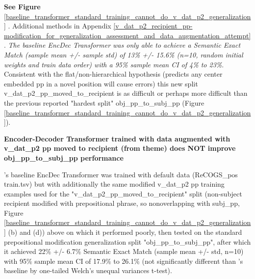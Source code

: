\documentclass[11pt]{article}
\begin{document}
\textbf{See Figure} \ref{baseline_transformer_standard_training_cannot_do_v_dat_p2_generalization} . Additional methods in Appendix \ref{v_dat_p2_recipient_pp-modification_for_generalization_assessment_and_data_augmentation_attempt}.
\textit{The baseline \citep{Wu2023} EncDec Transformer was only able to achieve a Semantic Exact Match (sample mean +/- sample std) of 13\% +/- 15.6\% (n=10, random initial weights and train data order) with a 95\% sample mean CI of 4\% to 23\%}. Consistent with the flat/non-hierarchical hypothesis (predicts any center embedded pp in a novel position will cause errors) this new split v\_dat\_p2\_pp\_moved\_to\_recipient is as difficult or perhaps more difficult than the previous reported "hardest split" obj\_pp\_to\_subj\_pp (Figure \ref{baseline_transformer_standard_training_cannot_do_v_dat_p2_generalization}).

\textbf{\citep{Wu2023} Encoder-Decoder Transformer trained with data augmented with v\_dat\_p2 pp moved to recipient (from theme) does NOT improve obj\_pp\_to\_subj\_pp performance}

\citep{Wu2023}'s baseline EncDec Transformer was trained with default data (ReCOGS\_pos train.tsv) but with additionally the same modified v\_dat\_p2 pp training examples used for the "v\_dat\_p2\_pp\_moved\_to\_recipient" split (non-subject recipient modified with prepositional phrase, so nonoverlapping with subj\_pp, Figure \ref{baseline_transformer_standard_training_cannot_do_v_dat_p2_generalization} (b) and (d)) above on which it performed poorly, then tested on the standard prepositional modification generalization split "obj\_pp\_to\_subj\_pp", after which it achieved 22\% +/- 6.7\% Semantic Exact Match (sample mean +/- std, n=10) with 95\% sample mean CI of 17.9\% to 26.1\% (not significantly different than \citep{Wu2023}'s baseline by one-tailed Welch's unequal variances t-test).
\end{document}
